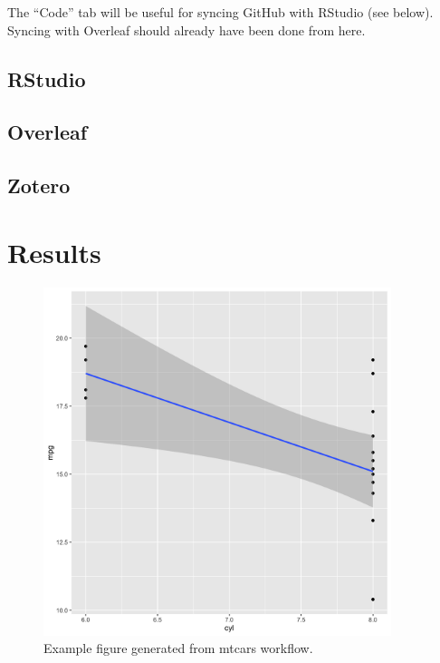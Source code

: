 \documentclass[12pt]{article}
\begin{document}
The ``Code'' tab will be useful for syncing GitHub with RStudio (see below). Syncing with Overleaf should already have been done from here.

\subsection{RStudio}
\subsection{Overleaf}
\subsection{Zotero}

\section{Results}

\begin{figure}[htbp]
    \centering
    \includegraphics[width=4in]{figures/mt_cars_summary.png}
    \caption{Example figure generated from mtcars workflow.}
    \label{fig:mtcars}
\end{figure}
\end{document}
